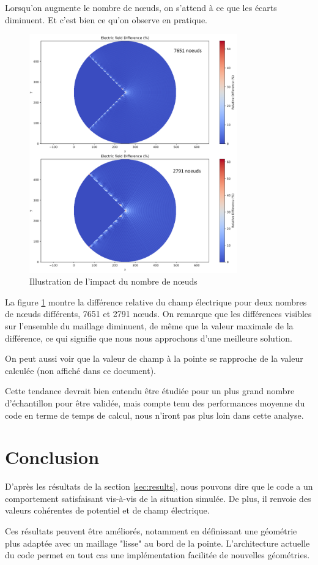 \documentclass{article}
\begin{document}
Lorsqu'on augmente le nombre de nœuds, on s'attend à ce que les écarts
diminuent. Et c'est bien ce qu'on observe en pratique.

\begin{figure}[!h]
    \centering
    \includegraphics[width=0.8\textwidth]{img/difference_elec_7651.png}
    \caption{Illustration de l'impact du nombre de nœuds}
    \label{fig:nodes_number_impact}
\end{figure}

La figure \ref{fig:nodes_number_impact} montre la différence
relative du champ électrique pour deux nombres de nœuds
différents, 7651 et 2791 nœuds. On remarque que les
différences visibles sur l'ensemble du maillage diminuent,
de même que la valeur maximale de la différence, ce qui
signifie que nous nous approchons d'une meilleure solution.

On peut aussi voir que la valeur de champ à la pointe
se rapproche de la valeur calculée (non affiché dans ce document).

Cette tendance devrait bien entendu être étudiée pour un
plus grand nombre d'échantillon pour être validée,
mais compte tenu des performances moyenne du code
en terme de temps de calcul, nous
n'iront pas plus loin dans cette analyse.

\newpage

\section{Conclusion}

D'après les résultats de la section \ref{sec:results}, nous pouvons
dire que le code a un comportement satisfaisant vis-à-vis de la
situation simulée. De plus, il renvoie des valeurs cohérentes de
potentiel et de champ électrique.

Ces résultats peuvent être améliorés, notamment en définissant
une géométrie plus adaptée avec un maillage "lisse" au bord
de la pointe. L'architecture actuelle du code permet en tout
cas une implémentation facilitée de nouvelles géométries.

\printbibliography[title={Références}]
\end{document}
